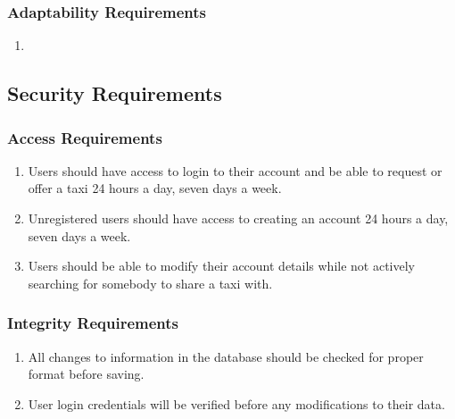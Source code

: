 \documentclass[]{article}
\begin{document}
\subsubsection{Adaptability Requirements}
\label{ssub:adaptability_requirements}
\begin{enumerate}[{MS}1. ]
	\item 
\end{enumerate}


\subsection{Security Requirements}
\label{sub:security_requirements}

\subsubsection{Access Requirements}
\label{ssub:access_requirements}
\begin{enumerate}[{SR}1. ]
	\item Users should have access to login to their account and be able to request or offer a taxi 24 hours a day, seven days a week.
	\item Unregistered users should have access to creating an account 24 hours a day, seven days a week.
	\item Users should be able to modify their account details while not actively searching for somebody to share a taxi with.
\end{enumerate}

\subsubsection{Integrity Requirements}
\label{ssub:integrity_requirements}
\begin{enumerate}[{SR}1. ]
	\item All changes to information in the database should be checked for proper format before saving.
	\item User login credentials will be verified before any modifications to their data.
\end{enumerate}
\end{document}
